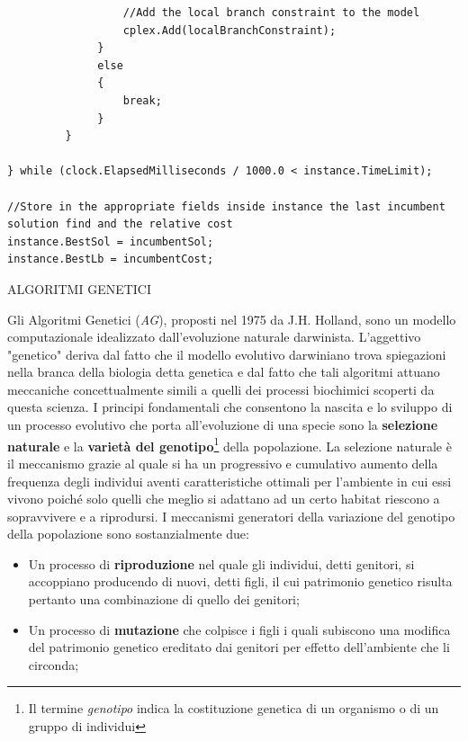 \documentclass[11pt]{article}
\begin{document}
\begin{lstlisting}
                  //Add the local branch constraint to the model
                  cplex.Add(localBranchConstraint);
              }
              else
              {
                  break;
              }                  
         }

} while (clock.ElapsedMilliseconds / 1000.0 < instance.TimeLimit);

//Store in the appropriate fields inside instance the last incumbent solution find and the relative cost
instance.BestSol = incumbentSol;
instance.BestLb = incumbentCost;

\end{lstlisting}

\vspace{2\baselineskip}
ALGORITMI GENETICI
\vspace{2\baselineskip}

Gli Algoritmi Genetici (\textit{AG}), proposti nel 1975 da J.H. Holland, sono un modello computazionale idealizzato dall'evoluzione naturale darwinista. L'aggettivo "genetico" deriva dal fatto che il modello evolutivo darwiniano trova spiegazioni nella branca della biologia detta genetica e dal fatto che tali algoritmi attuano meccaniche concettualmente simili a quelli dei processi biochimici scoperti da questa scienza. I principi fondamentali che consentono la nascita e lo sviluppo di un processo evolutivo che porta all'evoluzione di una specie sono la \textbf{selezione naturale} e la \textbf{varietà del genotipo}\footnote{Il termine \textit{genotipo} indica la costituzione genetica di un organismo o di un gruppo di individui} della popolazione.
La selezione naturale è il meccanismo grazie al quale si ha un progressivo e cumulativo aumento della frequenza degli individui aventi caratteristiche ottimali per l'ambiente in cui essi vivono poiché solo quelli che meglio si adattano ad un certo habitat riescono a sopravvivere e a riprodursi.
I meccanismi generatori della variazione del genotipo della popolazione sono sostanzialmente due:

\begin{itemize}
    \item Un processo di \textbf{riproduzione} nel quale gli individui, detti genitori, si accoppiano producendo di nuovi, detti figli, il cui patrimonio genetico risulta pertanto una combinazione di quello dei genitori;
    \item Un processo di \textbf{mutazione} che colpisce i figli i quali subiscono una modifica del patrimonio genetico ereditato dai genitori per effetto dell'ambiente che li circonda;
\end{itemize}
\end{document}
